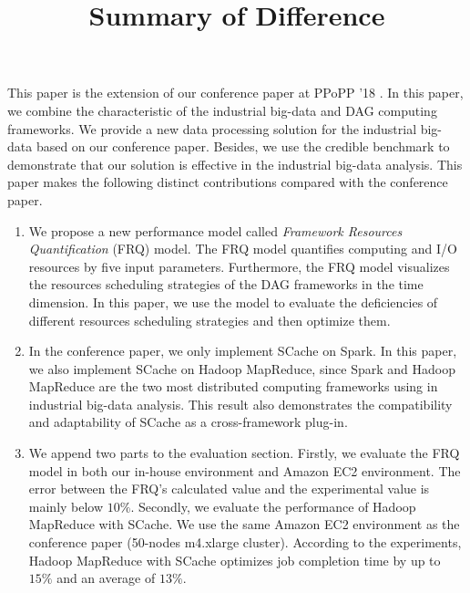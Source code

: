 \documentclass[12pt,reqno]{amsart}
\title{Summary of Difference}
\theoremstyle{plain}
\numberwithin{equation}{section}
\theoremstyle{plain}
\numberwithin{equation}{section}
\begin{document}
\maketitle



This paper is the extension of our conference paper at PPoPP '18 \cite{fu2018efficient}. 
In this paper, we combine the characteristic of the industrial big-data and DAG computing frameworks.
We provide a new data processing solution for the industrial big-data based on our conference paper.
Besides, we use the credible benchmark to demonstrate that our solution is effective in the industrial big-data analysis.
This paper makes the following distinct contributions compared with the conference paper.

\begin{enumerate}
\item 
We propose a new performance model called \textit{Framework Resources Quantification} (FRQ) model.
The FRQ model quantifies computing and I/O resources by five input parameters. 
Furthermore, the FRQ model visualizes the resources scheduling strategies of the DAG frameworks in the time dimension. 
In this paper, we use the model to evaluate the deficiencies of different resources scheduling strategies and then optimize them.
\item 
In the conference paper, we only implement SCache on Spark. 
In this paper, we also implement SCache on Hadoop MapReduce, since Spark and Hadoop MapReduce are the two most distributed computing frameworks using in industrial big-data analysis.
This result also demonstrates the compatibility and adaptability of SCache as a cross-framework plug-in.
\item
We append two parts to the evaluation section. 
Firstly, we evaluate the FRQ model in both our in-house environment and Amazon EC2 environment. The error between the FRQ’s calculated value and the experimental value is mainly below $10\%$. 
Secondly, we evaluate the performance of Hadoop MapReduce with SCache. We use the same Amazon EC2 environment as the conference paper (50-nodes m4.xlarge cluster).
According to the experiments, Hadoop MapReduce with SCache optimizes job completion time by up to $15\%$ and an average of $13\%$.
\end{enumerate}
\end{document}
